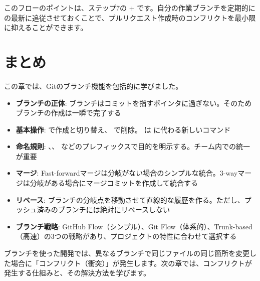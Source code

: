 このフローのポイントは、ステップ7の  +  です。自分の作業ブランチを定期的に  の最新に追従させておくことで、プルリクエスト作成時のコンフリクトを最小限に抑えることができます。

\section{まとめ}

この章では、Gitのブランチ機能を包括的に学びました。

\begin{itemize}
  \item \textbf{ブランチの正体}: ブランチはコミットを指すポインタに過ぎない。そのためブランチの作成は一瞬で完了する
  \item \textbf{基本操作}:  で作成と切り替え、 で削除。 は  に代わる新しいコマンド
  \item \textbf{命名規則}: 、、 などのプレフィックスで目的を明示する。チーム内での統一が重要
  \item \textbf{マージ}: Fast-forwardマージは分岐がない場合のシンプルな統合。3-wayマージは分岐がある場合にマージコミットを作成して統合する
  \item \textbf{リベース}: ブランチの分岐点を移動させて直線的な履歴を作る。ただし、プッシュ済みのブランチには絶対にリベースしない
  \item \textbf{ブランチ戦略}: GitHub Flow（シンプル）、Git Flow（体系的）、Trunk-based（高速）の3つの戦略があり、プロジェクトの特性に合わせて選択する
\end{itemize}

ブランチを使った開発では、異なるブランチで同じファイルの同じ箇所を変更した場合に「コンフリクト（衝突）」が発生します。次の章では、コンフリクトが発生する仕組みと、その解決方法を学びます。
